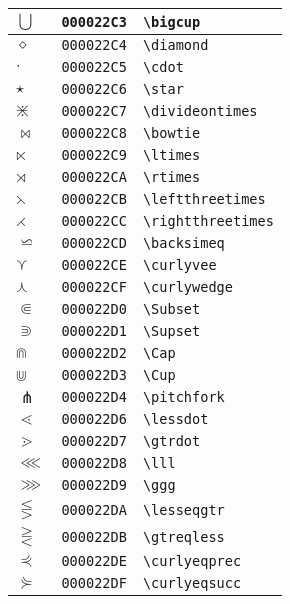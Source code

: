 \begin{longtable}{|l|l|l|}
\hline
$\bigcup$ & \texttt{000022C3} & \verb|\bigcup| \\
\hline
$\diamond$ & \texttt{000022C4} & \verb|\diamond| \\
\hline
$\cdot$ & \texttt{000022C5} & \verb|\cdot| \\
\hline
$\star$ & \texttt{000022C6} & \verb|\star| \\
\hline
$\divideontimes$ & \texttt{000022C7} & \verb|\divideontimes| \\
\hline
$\bowtie$ & \texttt{000022C8} & \verb|\bowtie| \\
\hline
$\ltimes$ & \texttt{000022C9} & \verb|\ltimes| \\
\hline
$\rtimes$ & \texttt{000022CA} & \verb|\rtimes| \\
\hline
$\leftthreetimes$ & \texttt{000022CB} & \verb|\leftthreetimes| \\
\hline
$\rightthreetimes$ & \texttt{000022CC} & \verb|\rightthreetimes| \\
\hline
$\backsimeq$ & \texttt{000022CD} & \verb|\backsimeq| \\
\hline
$\curlyvee$ & \texttt{000022CE} & \verb|\curlyvee| \\
\hline
$\curlywedge$ & \texttt{000022CF} & \verb|\curlywedge| \\
\hline
$\Subset$ & \texttt{000022D0} & \verb|\Subset| \\
\hline
$\Supset$ & \texttt{000022D1} & \verb|\Supset| \\
\hline
$\Cap$ & \texttt{000022D2} & \verb|\Cap| \\
\hline
$\Cup$ & \texttt{000022D3} & \verb|\Cup| \\
\hline
$\pitchfork$ & \texttt{000022D4} & \verb|\pitchfork| \\
\hline
$\lessdot$ & \texttt{000022D6} & \verb|\lessdot| \\
\hline
$\gtrdot$ & \texttt{000022D7} & \verb|\gtrdot| \\
\hline
$\lll$ & \texttt{000022D8} & \verb|\lll| \\
\hline
$\ggg$ & \texttt{000022D9} & \verb|\ggg| \\
\hline
$\lesseqgtr$ & \texttt{000022DA} & \verb|\lesseqgtr| \\
\hline
$\gtreqless$ & \texttt{000022DB} & \verb|\gtreqless| \\
\hline
$\curlyeqprec$ & \texttt{000022DE} & \verb|\curlyeqprec| \\
\hline
$\curlyeqsucc$ & \texttt{000022DF} & \verb|\curlyeqsucc| \\
\hline

\end{longtable}

